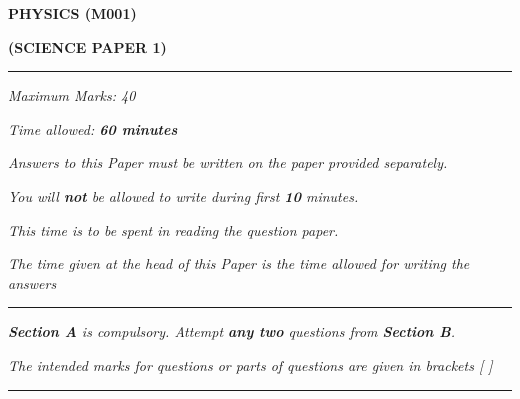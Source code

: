\begin{center}
   \Large
   \textbf{PHYSICS (M001)}

   \textbf{(SCIENCE PAPER 1)}
   \rule{\textwidth}{0.4pt}
   \normalsize
   \textit{Maximum Marks: 40}

   \textit{Time allowed: \textbf{60 minutes}}

   \textit{Answers to this Paper must be written on the paper provided separately.}

   \textit{You will \textbf{not} be allowed to write during first \textbf{10} minutes.}

   \textit{This time is to be spent in reading the question paper.}

   \textit{The time given at the head of this Paper is the time allowed for writing the answers}
   \rule{\textwidth}{0.4pt}
   \small

   \textit{\textbf{Section A} is compulsory. Attempt \textbf{any two} questions from \textbf{Section B}.}

   \textit{The intended marks for questions or parts of questions are given in brackets [ ]}
   \rule{\textwidth}{0.4pt}
\end{center}

